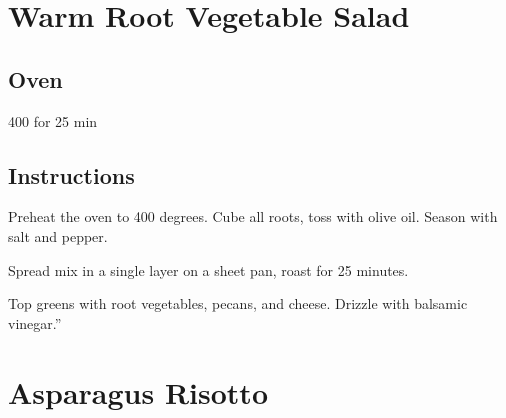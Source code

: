 \documentclass[ansiapaper,10pt,english]{sphinxmanual}
\begin{document}
\chapter{Warm Root Vegetable Salad}
\label{\detokenize{wrv_salad:warm-root-vegetable-salad}}\label{\detokenize{wrv_salad::doc}}
%
\begin{sphinxVerbatim}[commandchars=\\\{\}]
  

  

  

   

     

     

    

  

 

    

   
\end{sphinxVerbatim}


\section{Oven}
\label{\detokenize{wrv_salad:oven}}
400 for 25 min


\section{Instructions}
\label{\detokenize{wrv_salad:instructions}}
Preheat the oven to 400 degrees. Cube all roots, toss with olive oil. Season with salt and pepper.

Spread mix in a single layer on a sheet pan, roast for 25 minutes.

Top greens with root vegetables, pecans, and cheese. Drizzle with balsamic vinegar.”


\chapter{Asparagus Risotto}
\label{\detokenize{Asp_Risotto:asparagus-risotto}}\label{\detokenize{Asp_Risotto::doc}}
\end{document}
